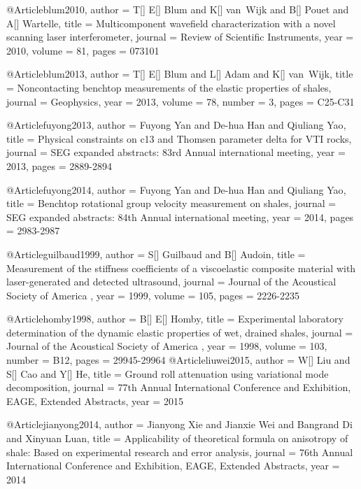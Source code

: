 @Article{blum2010,
  author = 	 {T[] E[] Blum and K[] van~Wijk and B[] Pouet and A[] Wartelle},
  title = 	 {Multicomponent wavefield characterization with a novel scanning laser interferometer},
  journal = 	 {Review of Scientific Instruments},
  year = 	 2010,
  volume = 	 81,
  pages = 	 {073101}}

@Article{blum2013,
  author = 	 {T[] E[] Blum and L[] Adam and K[] van~Wijk},
  title = 	 {Noncontacting benchtop measurements of the elastic properties of shales},
  journal = 	 {Geophysics},
  year = 	 2013,
  volume = 	 78,
  number = 	 3,
  pages = 	 {C25-C31}}

@Article{fuyong2013,
  author = 	 {Fuyong Yan and De-hua Han and Qiuliang Yao},
  title = 	 {Physical constraints on c13 and Thomsen parameter delta for VTI rocks},
  journal = 	 {SEG expanded abstracts: 83rd Annual international meeting},
  year = 	 2013,
  pages = 	 {2889-2894}}

@Article{fuyong2014,
  author = 	 {Fuyong Yan and De-hua Han and Qiuliang Yao},
  title = 	 {Benchtop rotational group velocity measurement on shales},
  journal = 	 {SEG expanded abstracts: 84th Annual international meeting},
  year = 	 2014,
  pages = 	 {2983-2987}}

@Article{guilbaud1999,
  author = 	 {S[] Guilbaud and B[] Audoin},
  title = 	 {Measurement of the stiffness coefficients of a viscoelastic composite material with laser-generated and detected ultrasound},
  journal = 	 { Journal of the Acoustical Society of America },
  year = 	 1999,
  volume = 	 105,
  pages = 	 {2226-2235}}

@Article{homby1998,
  author = 	 {B[] E[] Homby},
  title = 	 {Experimental laboratory determination of the dynamic elastic properties of wet, drained shales},
  journal = 	 { Journal of the Acoustical Society of America },
  year = 	 1998,
  volume = 	 103,
  number = B12,
  pages = 	 {29945-29964}}
@Article{liuwei2015,
  author = 	 {W[] Liu and S[] Cao and Y[] He},
  title = 	 {Ground roll attenuation using variational mode decomposition},
  journal = 	 { 77th Annual International Conference and Exhibition, EAGE, Extended Abstracts},
  year = 	 2015}
  
@Article{jianyong2014,
  author = 	 {Jianyong Xie and Jianxie Wei and Bangrand Di and Xinyuan Luan},
  title = 	 {Applicability of theoretical formula on anisotropy of shale: Based on experimental research and error analysis},
  journal = 	 { 76th Annual International Conference and Exhibition, EAGE, Extended Abstracts},
  year = 	 2014}


